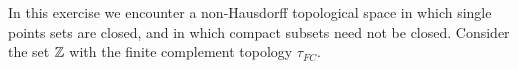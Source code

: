 \begin{comment}

\ExerciseSolution We know that any finite set is compact, so assume from this point on that $X$ is an infinite set.

\ba
	\item If $C$ is a finite subset of $X$, then $C$ is compact. We claim that no infinite subset $C$ of $X$ is compact. Assume that $C$ is an infinite subset of $X$. For each $c$ in $C$, let $O_c = \{p,c\}$.  Since $p \in O_c$ for each $c$, we conclude that $O_c$ is an open set. Thus, $\mathcal{O} = \{O_c \mid c \in C\}$ is an open cover for $C$. If $\{O_{\alpha}\}$ is a finite subset of $\mathcal{O}$, then $\bigcup O_{\alpha}$ is finite set and cannot cover the infinite set $C$. Thus, the open cover $\mathcal{O}$ of $C$ has no finite subcover and $C$ is not a compact subset of $(X \tau_p)$. Therefore, the only compact subsets of $(X, \tau_p)$ are the finite subsets.
	
	\item If $C$ is a finite subset of $X$, then $C$ is compact. Assume that $C$ is an infinite subset of $X$. We will show that $C$ is compact if and only if $p \in C$. 
	
	First assume that $p \in C$. Let $\{O_{\alpha}\}_{\alpha \in I}$ be an open cover of $C$. Then $p \in O_{\alpha}$ for some $\alpha \in I$. The only open set that contains $p$ is $X$, so $O_{\alpha} = X$. Then $\{X\}$ is an open subcover of the open cover $\{O_{\alpha}\}_{\alpha \in I}$. Thus, $C$ is compact in $(X, \tau_{\overline{p}})$. 
	
	Now assume that $p \notin C$. Let $O_c = \{c\}$ for every $c \in C$. Since $p \notin C$ we know that $O_c$ is in $\tau_{\overline{p}}$. Let $\mathcal{O} = \{O_c\}_{c \in C}$. Then $\mathcal{O}$ is an open cover of $C$ that has no finite subcover. Thus $C$ is not compact. 
	
	We conclude that the compact subsets of $(X, \tau_{\overline{p}})$ are the finite sets and the infinite sets that contain $p$.  
	
	\ea



\end{comment}

\item In this exercise we encounter a non-Hausdorff topological space in which single points sets are closed, and in which compact subsets need not be closed. Consider the set $\mathbb{Z}$ with the finite complement topology $\tau_{FC}$.  

